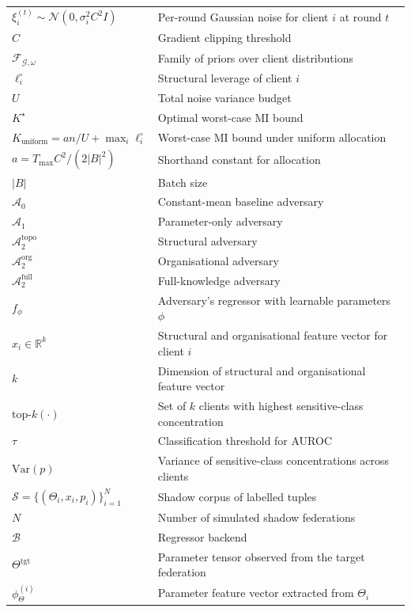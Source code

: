 \documentclass[letterpaper,journal]{IEEEtran}
\begin{document}
\begin{table}[h]
\begin{tabular}{@{}ll@{}}
$\xi_i^{(t)} \sim \mathcal{N}(0, \sigma_i^2 C^2 I)$ & Per-round Gaussian noise for client $i$ at round $t$ \\
$C$ & Gradient clipping threshold \\
$\mathcal{F}_{\mathcal{G}, \omega}$ & Family of priors over client distributions \\
$\ell_i^\circ$ & Structural leverage of client $i$ \\
$U$ & Total noise variance budget \\
$K^\star$ & Optimal worst-case MI bound \\
$K_{\mathrm{uniform}} = an/U + \max_i \ell_i^\circ$ & Worst-case MI bound under uniform allocation \\
$a = T_{\max} C^2 / (2|B|^2)$ & Shorthand constant for allocation \\
$|B|$ & Batch size \\
$\mathcal{A}_0$ & Constant-mean baseline adversary \\
$\mathcal{A}_1$ & Parameter-only adversary \\
$\mathcal{A}_2^{\text{topo}}$ & Structural adversary \\
$\mathcal{A}_2^{\text{org}}$ & Organisational adversary \\
$\mathcal{A}_2^{\text{full}}$ & Full-knowledge adversary \\
$f_\phi$ & Adversary's regressor with learnable parameters $\phi$ \\
$x_i \in \mathbb{R}^k$ & Structural and organisational feature vector for client $i$ \\
$k$ & Dimension of structural and organisational feature vector \\
$\text{top-}k(\cdot)$ & Set of $k$ clients with highest sensitive-class concentration \\
$\tau$ & Classification threshold for AUROC \\
$\mathrm{Var}(p)$ & Variance of sensitive-class concentrations across clients \\
$\mathcal{S} = \{(\Theta_i, x_i, p_i)\}_{i=1}^{N}$ & Shadow corpus of labelled tuples \\
$N$ & Number of simulated shadow federations \\
$\mathcal{B}$ & Regressor backend \\
$\Theta^{\text{tgt}}$ & Parameter tensor observed from the target federation \\
$\phi_{\Theta}^{(i)}$ & Parameter feature vector extracted from $\Theta_i$ \\

\end{tabular}
\end{table}
\end{document}
